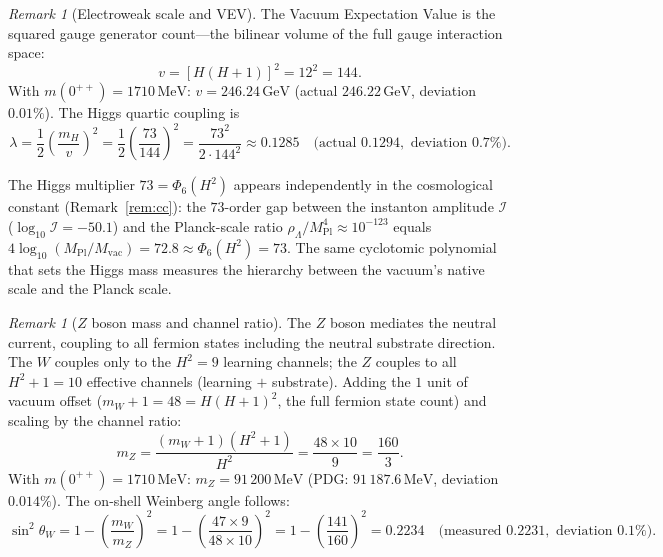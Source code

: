 \documentclass[11pt,a4paper]{article}
\theoremstyle{definition}
\theoremstyle{remark}
\newtheorem{remark}[theorem]{Remark}
\begin{document}
\begin{remark}[Electroweak scale and VEV]\label{rem:higgs}
The Vacuum Expectation Value is the squared gauge generator count---the bilinear volume of the full gauge interaction space:
\begin{equation}\label{eq:vev}
v = [H(H+1)]^2 = 12^2 = 144.
\end{equation}
With $m(0^{++})=1710\,\mathrm{MeV}$: $v=246.24\,\mathrm{GeV}$ (actual $246.22\,\mathrm{GeV}$, deviation $0.01\%$). The Higgs quartic coupling is
\[
\lambda = \frac{1}{2}\!\left(\frac{m_H}{v}\right)^2 = \frac{1}{2}\!\left(\frac{73}{144}\right)^2 = \frac{73^2}{2\cdot 144^2} \approx 0.1285 \quad\text{(actual }0.1294,\text{ deviation }0.7\%).
\]

The Higgs multiplier $73=\Phi_6(H^2)$ appears independently in the cosmological constant (Remark~\ref{rem:cc}): the $73$-order gap between the instanton amplitude $\mathcal{I}$ ($\log_{10}\mathcal{I}=-50.1$) and the Planck-scale ratio $\rho_\Lambda/M_{\mathrm{Pl}}^4\approx 10^{-123}$ equals $4\log_{10}(M_{\mathrm{Pl}}/M_{\mathrm{vac}})=72.8\approx\Phi_6(H^2)=73$. The same cyclotomic polynomial that sets the Higgs mass measures the hierarchy between the vacuum's native scale and the Planck scale.
\end{remark}

\begin{remark}[$Z$ boson mass and channel ratio]\label{rem:WZ}
The $Z$ boson mediates the neutral current, coupling to all fermion states including the neutral substrate direction. The $W$ couples only to the $H^2=9$ learning channels; the $Z$ couples to all $H^2+1=10$ effective channels (learning $+$ substrate). Adding the $1$ unit of vacuum offset ($m_W+1=48=H(H+1)^2$, the full fermion state count) and scaling by the channel ratio:
\begin{equation}\label{eq:mZ}
m_Z = \frac{(m_W+1)(H^2+1)}{H^2} = \frac{48\times 10}{9} = \frac{160}{3}.
\end{equation}
With $m(0^{++})=1710\,\mathrm{MeV}$: $m_Z=91\,200\,\mathrm{MeV}$ (PDG: $91\,187.6\,\mathrm{MeV}$, deviation $0.014\%$). The on-shell Weinberg angle follows:
\[
\sin^2\theta_W = 1-\left(\frac{m_W}{m_Z}\right)^2 = 1-\left(\frac{47\times 9}{48\times 10}\right)^2 = 1-\left(\frac{141}{160}\right)^2 = 0.2234 \quad\text{(measured }0.2231,\text{ deviation }0.1\%).
\]
\end{remark}
\end{document}
